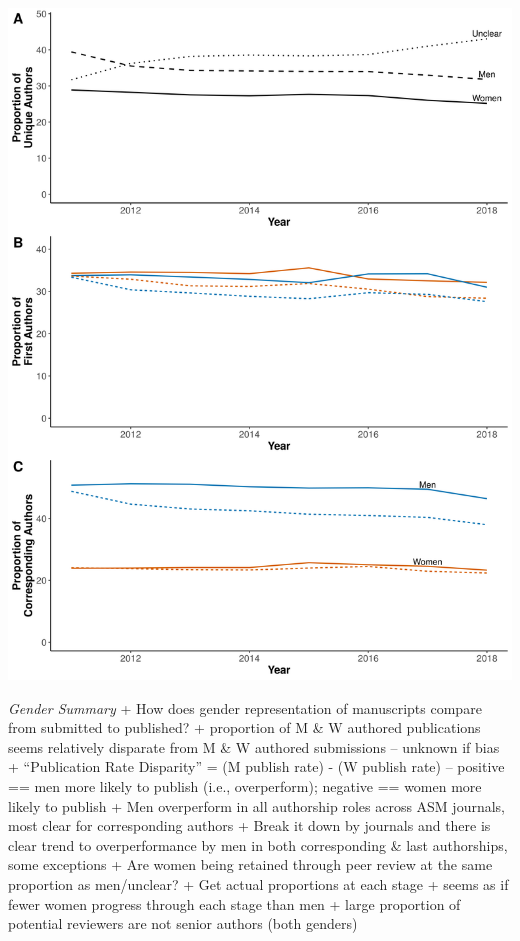 \documentclass[11pt,]{article}
\begin{document}
\includegraphics{Figure_3.png}

\emph{Gender Summary} + How does gender representation of manuscripts
compare from submitted to published? + proportion of M \& W authored
publications seems relatively disparate from M \& W authored submissions
-- unknown if bias + ``Publication Rate Disparity'' = (M publish rate) -
(W publish rate) -- positive == men more likely to publish (i.e.,
overperform); negative == women more likely to publish + Men overperform
in all authorship roles across ASM journals, most clear for
corresponding authors + Break it down by journals and there is clear
trend to overperformance by men in both corresponding \& last
authorships, some exceptions + Are women being retained through peer
review at the same proportion as men/unclear? + Get actual proportions
at each stage + seems as if fewer women progress through each stage than
men + large proportion of potential reviewers are not senior authors
(both genders)
\end{document}

